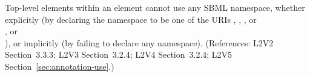 Top-level elements within an  element cannot use any SBML
namespace, whether explicitly (by declaring the namespace to be one of the
URIs ,
, 
, or\\
, or\\
), or implicitly (by failing
to declare any namespace).  (References: L2V2 Section~3.3.3; L2V3
Section~3.2.4; L2V4 Section~3.2.4; L2V5 Section~\ref{sec:annotation-use}.)

